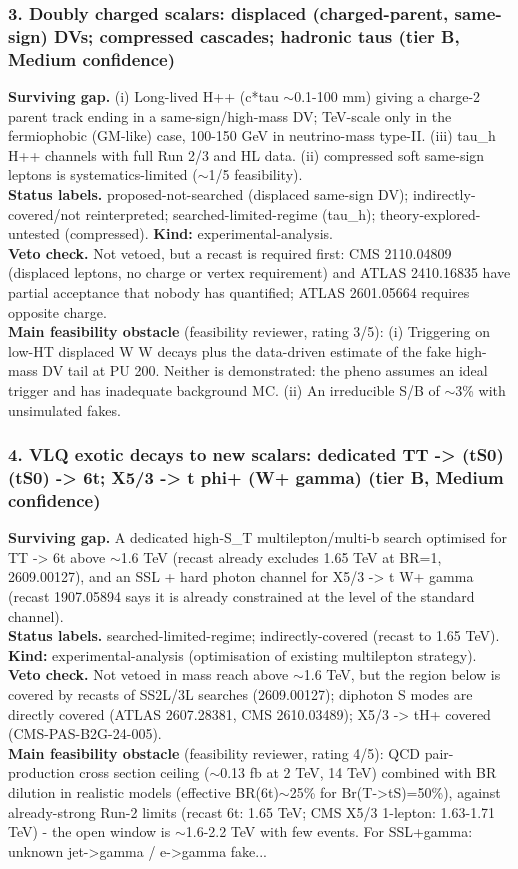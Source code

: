 \documentclass[11pt,a4paper]{article}
\begin{document}
\subsubsection*{3. Doubly charged scalars: displaced (charged-parent, same-sign) DVs; compressed cascades; hadronic taus (tier B, Medium confidence)}
\textbf{Surviving gap.} (i) Long-lived H++ (c*tau $\sim$0.1-100 mm) giving a charge-2 parent track ending in a same-sign/high-mass DV; TeV-scale only in the fermiophobic (GM-like) case, 100-150 GeV in neutrino-mass type-II. (iii) tau\_h H++ channels with full Run 2/3 and HL data. (ii) compressed soft same-sign leptons is systematics-limited ($\sim$1/5 feasibility).\\
\textbf{Status labels.} proposed-not-searched (displaced same-sign DV); indirectly-covered/not reinterpreted; searched-limited-regime (tau\_h); theory-explored-untested (compressed). \textbf{Kind:} experimental-analysis.\\
\textbf{Veto check.} Not vetoed, but a recast is required first: CMS 2110.04809 (displaced leptons, no charge or vertex requirement) and ATLAS 2410.16835 have partial acceptance that nobody has quantified; ATLAS 2601.05664 requires opposite charge.
\\\textbf{Main feasibility obstacle} (feasibility reviewer, rating 3/5): (i) Triggering on low-HT displaced W W decays plus the data-driven estimate of the fake high-mass DV tail at PU 200. Neither is demonstrated: the pheno assumes an ideal trigger and has inadequate background MC. (ii) An irreducible S/B of $\sim$3\% with unsimulated fakes.

\subsubsection*{4. VLQ exotic decays to new scalars: dedicated TT -> (tS0)(tS0) -> 6t; X5/3 -> t phi+ (W+ gamma) (tier B, Medium confidence)}
\textbf{Surviving gap.} A dedicated high-S\_T multilepton/multi-b search optimised for TT -> 6t above $\sim$1.6 TeV (recast already excludes 1.65 TeV at BR=1, 2609.00127), and an SSL + hard photon channel for X5/3 -> t W+ gamma (recast 1907.05894 says it is already constrained at the level of the standard channel).\\
\textbf{Status labels.} searched-limited-regime; indirectly-covered (recast to 1.65 TeV). \textbf{Kind:} experimental-analysis (optimisation of existing multilepton strategy).\\
\textbf{Veto check.} Not vetoed in mass reach above $\sim$1.6 TeV, but the region below is covered by recasts of SS2L/3L searches (2609.00127); diphoton S modes are directly covered (ATLAS 2607.28381, CMS 2610.03489); X5/3 -> tH+ covered (CMS-PAS-B2G-24-005).
\\\textbf{Main feasibility obstacle} (feasibility reviewer, rating 4/5): QCD pair-production cross section ceiling ($\sim$0.13 fb at 2 TeV, 14 TeV) combined with BR dilution in realistic models (effective BR(6t)$\sim$25\% for Br(T->tS)=50\%), against already-strong Run-2 limits (recast 6t: 1.65 TeV; CMS X5/3 1-lepton: 1.63-1.71 TeV) - the open window is $\sim$1.6-2.2 TeV with few events. For SSL+gamma: unknown jet->gamma / e->gamma fake...
\end{document}
